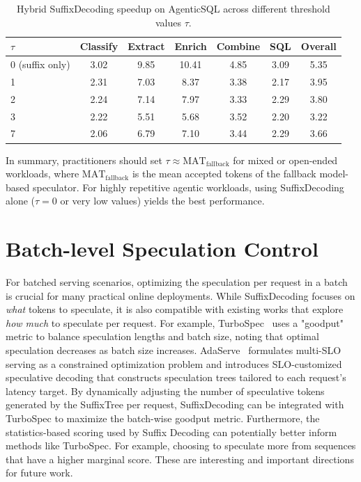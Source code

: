\begin{table}[h]
\centering
\caption{Hybrid SuffixDecoding speedup on AgenticSQL across different threshold values $\tau$.}
\label{tab:threshold-agenticsql}
\small
\begin{tabular}{lcccccc}
\toprule
$\tau$ & Classify & Extract & Enrich & Combine & SQL & Overall \\
\midrule
0 (suffix only) & 3.02 & 9.85 & 10.41 & 4.85 & 3.09 & 5.35 \\
1 & 2.31 & 7.03 & 8.37 & 3.38 & 2.17 & 3.95 \\
2 & 2.24 & 7.14 & 7.97 & 3.33 & 2.29 & 3.80 \\
3 & 2.22 & 5.51 & 5.68 & 3.52 & 2.20 & 3.22 \\
7 & 2.06 & 6.79 & 7.10 & 3.44 & 2.29 & 3.66 \\
\bottomrule
\end{tabular}
\end{table}

In summary, practitioners should set $\tau \approx \text{MAT}_{\text{fallback}}$ for mixed or open-ended workloads, where $\text{MAT}_{\text{fallback}}$ is the mean accepted tokens of the fallback model-based speculator. For highly repetitive agentic workloads, using SuffixDecoding alone ($\tau = 0$ or very low values) yields the best performance.

\section{Batch-level Speculation Control}
\label{sec:batch-speculation}

For batched serving scenarios, optimizing the speculation per request in a batch is crucial for many practical online deployments. While SuffixDecoding focuses on \textit{what} tokens to speculate, it is also compatible with existing works that explore \textit{how much} to speculate per request. For example, TurboSpec~\citep{liu2024turbospec} uses a "goodput" metric to balance speculation lengths and batch size, noting that optimal speculation decreases as batch size increases. AdaServe~\citep{adaserve} formulates multi-SLO serving as a constrained 
optimization problem and introduces SLO-customized speculative decoding that constructs speculation trees tailored to each request's latency target.
%
By dynamically adjusting the number of speculative tokens generated by the SuffixTree per request, SuffixDecoding can be integrated with TurboSpec to maximize the batch-wise goodput metric.
%
Furthermore, the statistics-based scoring used by Suffix Decoding can potentially better inform methods like TurboSpec. For example, choosing to speculate more from sequences that have a higher marginal score. 
%
These are interesting and important directions for future work.


